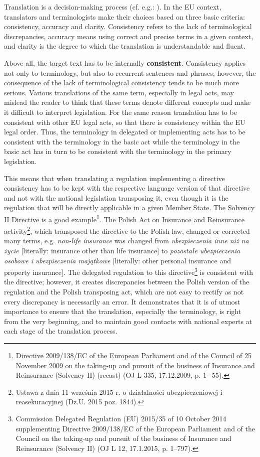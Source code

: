 \documentclass[output=paper]{langsci/langscibook}
\begin{document}
Translation is a decision-making process (cf. e.g.: \citealt{Levý1967}). In the EU context, translators and terminologists make their choices based on three basic criteria: consistency, accuracy and clarity. Consistency refers to the lack of terminological discrepancies, accuracy means using correct and precise terms in a given context, and clarity is the degree to which the translation is understandable and fluent.

Above all, the target text has to be internally \textbf{consistent}. Consistency applies not only to terminology, but also to recurrent sentences and phrases; however, the consequence of the lack of terminological consistency tends to be much more serious. Various translations of the same term, especially in legal acts, may mislead the reader to think that these terms denote different concepts and make it difficult to interpret legislation. For the same reason translation has to be consistent with other EU legal acts, so that there is consistency within the EU legal order. Thus, the terminology in delegated or implementing acts has to be consistent with the terminology in the basic act while the terminology in the basic act has in turn to be consistent with the terminology in the primary legislation. 

This means that when translating a regulation implementing a directive consistency has to be kept with the respective language version of that directive and not with the national legislation transposing it, even though it is the regulation that will be directly applicable in a given Member State. The Solvency II Directive is a good example\footnote{Directive 2009/138/EC of the European Parliament and of the Council of 25 November 2009 on the taking-up and pursuit of the business of Insurance and Reinsurance (Solvency II) (recast) (OJ L 335, 17.12.2009, p. 1$-$55).}. The Polish Act on Insurance and Reinsurance activity\footnote{Ustawa z dnia 11 września 2015 r. o działalności ubezpieczeniowej i reasekuracyjnej (Dz.U. 2015 poz. 1844).}, which transposed the directive to the Polish law, changed or corrected many terms, e.g. \textit{non-life insurance} was changed from \textit{ubezpieczenia inne niż na życie} [literally: insurance other than life insurance] to \textit{pozostałe ubezpieczenia osobowe i ubezpieczenia majątkowe} [literally: other personal insurance and property insurance]. The delegated regulation to this directive\footnote{Commission Delegated Regulation (EU) 2015/35 of 10 October 2014 supplementing Directive 2009/138/EC of the European Parliament and of the Council on the taking-up and pursuit of the business of Insurance and Reinsurance (Solvency II) (OJ L 12, 17.1.2015, p. 1–797).} is consistent with the directive; however, it creates discrepancies between the Polish version of the regulation and the Polish transposing act, which are not easy to rectify as not every discrepancy is necessarily an error. It demonstrates that it is of utmost importance to ensure that the translation, especially the terminology, is right from the very beginning, and to maintain good contacts with national experts at each stage of the translation process.
\end{document}
